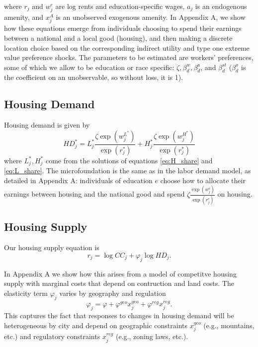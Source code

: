 \documentclass{article}
\begin{document}
where $r_j$ and $w_j^e$ are log rents and education-specific wages, $a_j$ is an endogenous amenity, and $x_j^{A}$ is an unobserved exogenous amenity. In Appendix A, we show how  these equations emerge from individuals choosing to spend their earnings between a national and a local good (housing), and then making a discrete location choice based on the corresponding indirect utility and type one extreme value preference shocks. The parameters to be estimated are workers' preferences, some of which we allow to be education or race specific: $\zeta, \beta_d^w, \beta_d^a$, and $\beta_d^{st}$ ($\beta_d^x$ is the coefficient on an unobservable, so without loss, it is 1).  

\subsection{Housing Demand}
Housing demand is given by 
\begin{equation} \label{eq: housing demand}  HD_{j}^* = L_{j}^* \frac{\zeta \exp(w_{j}^{L^*})}{\exp(r_{j}^*)} + H_{j}^* \frac{\zeta \exp(w_{j}^{H^*})}{\exp(r_{j}^*)} 
\end{equation}
where $L_j^*, H_j^*$ come from the solutions of equations \ref{eq:H_share} and \ref{eq:L_share}. The microfoundation is the same as in the labor demand model, as detailed in Appendix A: individuals of education $e$ choose how to allocate their earnings between housing and the national good and spend $\zeta \frac{\exp(w_j^e)}{\exp(r_j^e)}$ on housing.


\subsection{Housing Supply}

Our housing supply equation is \begin{equation}\label{eq: housing supply}
    r_{j} = \log CC_{j} + \varphi_j \log HD_{j}.
\end{equation}

In Appendix A we show how this arises from a model of competitve housing supply with marginal costs that depend on contruction and land costs. The elasticity term $\varphi_j$ varies by geography and regulation
$$\varphi_j = \varphi + \varphi^{geo}x_j^{geo} + \varphi^{reg} x_j^{reg}.$$
This captures the fact that responses to changes in housing demand will be heterogeneous by city and depend on geographic constraints $x_j^{geo}$ (e.g., mountains, etc.) and regulatory constraints $x_j^{reg}$ (e.g., zoning laws, etc.). 
\end{document}
